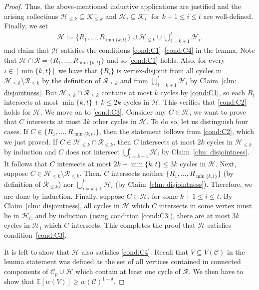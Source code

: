 \documentclass[10pt,a4paper]{amsart}
\begin{document}
\begin{proof}
   Thus, the above-mentioned inductive applications are justified and the arising collections $\mathcal{H}_{\le k}\subseteq \mathcal{K}_{\le k}^-$ and $\mathcal{H}_i\subseteq \mathcal{K}_i^-$ for $k+1\le i\le t$ are well-defined. Finally, we set\begin{align*}
        \mathcal H := \{R_1,\ldots,R_{\min\{k,t\}}\}\cup \mathcal H_{\leq k}\cup \bigcup_{i=k+1}^t\mathcal H_i.
    \end{align*}
     and claim that $\mathcal H$ satisfies the conditions \ref{cond:C1}--\ref{cond:C4} in the lemma. Note that $\mathcal{H}\cap \mathcal{R}=\{R_1,\ldots,R_{\min\{k,t\}}\}$ and so \ref{cond:C1} holds. Also, for every $i\in [\min\{k,t\}]$ we have that $\{R_i\}$ is vertex-disjoint from all cycles in $\mathcal H_{\leq k}\setminus \mathcal R_{\leq k}$ by the definition of $\mathcal R_{\leq k}$ and from $\bigcup_{i=k+1}^t\mathcal H_i$ by Claim~\ref{clm: disjointness}. But $\mathcal H_{\leq k}\cap \mathcal R_{\leq k}$ contains at most $k$ cycles by \ref{cond:C1}, so each $R_i$ intersects at most $\min\{k,t\}+k\le 2k$ cycles in $\mathcal{H}$. This verifies that \ref{cond:C2} holds for $\mathcal{H}$. We move on to \ref{cond:C3}. Consider any $C\in\mathcal H$, we want to prove that $C$ intersects at most $3k$ other cycles in $\mathcal{H}$. To do so, let us distinguish four cases. If $C\in\{R_1,\ldots,R_{\min\{k,t\}}\}$, then the statement follows from \ref{cond:C2}, which we just proved. If $C\in \mathcal{H}_{\le k}\cap \mathcal R_{\leq k}$, then $C$ intersects at most $2k$ cycles in $\mathcal H_{\leq k}$ by induction and $C$ does not intersect $\bigcup_{i=k+1}^t\mathcal H_i$ by Claim~\ref{clm: disjointness}. It follows that $C$ intersects at most $2k+\min\{k,t\}\le 3k$ cycles in $\mathcal H$. Next, suppose $C\in \mathcal H_{\leq k}\setminus\mathcal R_{\leq k}$. Then, $C$ intersects neither $\{R_1,\ldots,R_{\min\{k,t\}}\}$ (by definition of $\mathcal R_{\leq k}$) nor $\bigcup_{i=k+1}^t\mathcal H_i$ (by Claim~\ref{clm: disjointness}). Therefore, we are done by induction. Finally, suppose $C\in \mathcal H_i$ for some $k+1\leq i\leq t$. By Claim~\ref{clm: disjointness}, all cycles in $\mathcal{H}$ which $C$ intersects in some vertex must lie in $\mathcal H_i$, and by induction (using condition \ref{cond:C3}), there are at most $3k$ cycles in $\mathcal{H}_i$ which $C$ intersects. This completes the proof that $\mathcal{H}$ satisfies condition~\ref{cond:C3}.

    It is left to show that $\mathcal{H}$ also satisfies \ref{cond:C4}. 
    Recall that $V\subseteq V(\mathcal C)$ in the lemma statement was defined as the set of all vertices contained in connected components of $\mathcal C_p\cup \mathcal H$ which contain at least one cycle of $\mathcal{R}$. We then have to show that $\mathbb{E}[w(V)]\ge w(\mathcal C)^{1-\delta}$. 


\end{proof}
\end{document}
